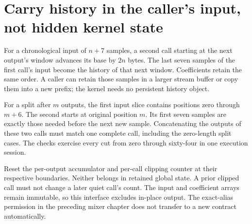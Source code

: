 \section{Carry history in the caller's input, not hidden kernel state}
For a chronological input of \(n+7\) samples, a second call starting at the next
output's window advances its base by \(2n\) bytes. The last seven samples of the
first call's input become the history of that next window. Coefficients retain the
same order. A caller can retain those samples in a larger stream buffer or copy them
into a new prefix; the kernel needs no persistent history object.

For a split after \(m\) outputs, the first input slice contains positions zero through
\(m+6\). The second starts at original position \(m\). Its first seven samples
are exactly those needed before the next new sample. Concatenating the outputs of
these two calls must match one complete call, including the zero-length split cases.
The checks exercise every cut from zero through sixty-four in one execution session.

Reset the per-output accumulator and per-call clipping counter at their respective
boundaries. Neither belongs in retained global state. A prior clipped call must not
change a later quiet call's count. The input and coefficient arrays remain immutable,
so this interface excludes in-place output. The exact-alias permission in the preceding
mixer chapter does not transfer to a new contract automatically.

